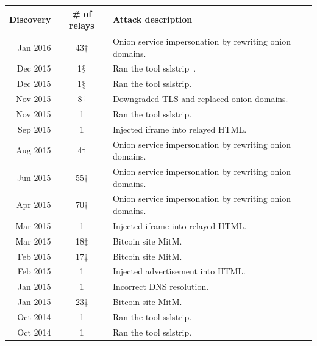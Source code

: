 \begin{table}[t]
\small
\centering
\begin{tabular}{r c p{4cm}}
\textbf{Discovery} & \textbf{\# of relays} & \textbf{Attack description} \\
\hline
Jan 2016 & 43$\dagger$ & Onion service impersonation by rewriting onion domains. \\
Dec 2015 & 1$\mathsection$ & Ran the tool sslstrip~\cite{sslstrip}. \\
Dec 2015 & 1$\mathsection$ & Ran the tool sslstrip. \\
Nov 2015 & 8$\dagger$ & Downgraded TLS and replaced onion domains. \\
Nov 2015 & 1 & Ran the tool sslstrip. \\
Sep 2015 & 1 & Injected iframe into relayed HTML. \\
Aug 2015 & 4$\dagger$ & Onion service impersonation by rewriting onion domains. \\
Jun 2015 & 55$\dagger$ & Onion service impersonation by rewriting onion domains. \\
Apr 2015 & 70$\dagger$ & Onion service impersonation by rewriting onion domains. \\
Mar 2015 & 1 & Injected iframe into relayed HTML. \\
Mar 2015 & 18$\ddagger$ & Bitcoin site MitM. \\
Feb 2015 & 17$\ddagger$ & Bitcoin site MitM. \\
Feb 2015 & 1 & Injected advertisement into HTML. \\
Jan 2015 & 1 & Incorrect DNS resolution. \\
Jan 2015 & 23$\ddagger$ & Bitcoin site MitM. \\
Oct 2014 & 1 & Ran the tool sslstrip. \\
Oct 2014 & 1 & Ran the tool sslstrip. \\

\end{tabular}
\end{table}
